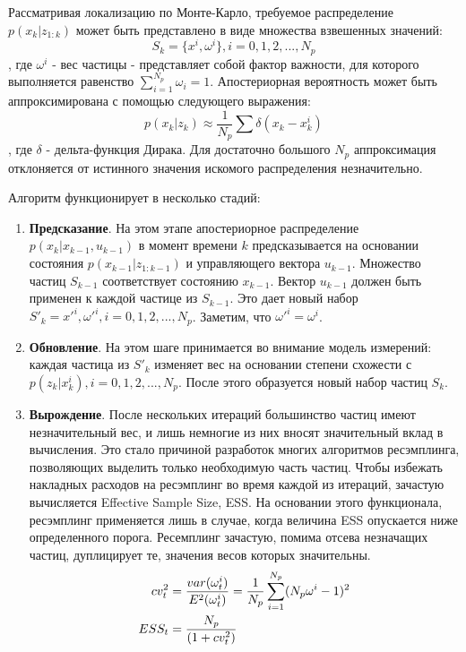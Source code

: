 Рассматривая локализацию по Монте-Карло, требуемое распределение \\$p(x_k | z_{1:k})$ может быть представлено в виде множества взвешенных значений:
\[
    S_k = \{ x^i, \omega^i \}, i = 0,1,2,...,N_p
\]
, где $\omega^i$ - вес частицы - представляет собой фактор важности, для которого выполняется равенство $\sum_{i=1}^{N_p} \omega_i = 1$. Апостериорная вероятность может быть аппроксимирована с помощью следующего выражения:
\[
    p(x_k | z_k) \approx \frac{1}{N_p} \sum \delta (x_k - x_k^i)
\]
, где $\delta$ - дельта-функция Дирака. Для достаточно большого $N_p$ аппроксимация отклоняется от истинного значения искомого распределения незначительно.

Алгоритм функционирует в несколько стадий:
\begin{enumerate}
    \item
    \textbf{Предсказание}. На этом этапе апостериорное распределение \\$p(x_k | x_{k-1}, u_{k-1})$ в момент времени $k$ предсказывается на основании состояния $p(x_{k-1} | z_{1:k-1})$ и управляющего вектора $u_{k-1}$. Множество частиц $S_{k-1}$ соответствует состоянию $x_{k-1}$. Вектор $u_{k-1}$ должен быть применен к каждой частице из $S_{k-1}$. Это дает новый набор $S'_k = x'^i, \omega'^i, i=0,1,2,..., N_p$. Заметим, что $\omega'^i = \omega^i$.
    \item
    \textbf{Обновление}. На этом шаге принимается во внимание модель измерений: каждая частица из $S'_k$ изменяет вес на основании степени схожести с $p(z_k | x^i_k), i=0,1,2,...,N_p$. После этого образуется новый набор частиц $S_k$.
    \item
    \textbf{Вырождение}. После нескольких итераций большинство частиц имеют незначительный вес, и лишь немногие из них вносят значительный вклад в вычисления. Это стало причиной разработок многих алгоритмов ресэмплинга, позволяющих выделить только необходимую часть частиц. Чтобы избежать накладных расходов на ресэмплинг во время каждой из итераций, зачастую вычисляется Effective Sample Size, ESS. На основании этого функционала, ресэмплинг применяется лишь в случае, когда величина ESS опускается ниже определенного порога. Ресемплинг зачастую, помима отсева незначащих частиц, дуплицирует те, значения весов которых значительны.
    \begin{align}
        cv_t^2 &= \frac{var(\omega_t^i)}{ E^2(\omega_t^i) } = \frac{1}{N_p} \sum_{i=1}^{N_p} (N_p \omega^i - 1)^2 \notag \\
        ESS_t &= \frac{N_p}{(1+cv_t^2)} \notag
    \end{align}
\end{enumerate}